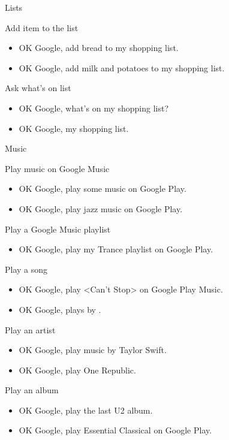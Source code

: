 \documentclass[
  a4paper,
]{article}
\providecommand{\tightlist}{%
  \setlength{\itemsep}{0pt}\setlength{\parskip}{0pt}}\usepackage{longtable,booktabs,array}
\begin{document}
Lists

Add item to the list

\begin{itemize}
\item
  OK Google, add bread to my shopping list.
\item
  OK Google, add milk and potatoes to my shopping list.
\end{itemize}

Ask what's on list

\begin{itemize}
\item
  OK Google, what's on my shopping list?
\item
  OK Google, my shopping list.
\end{itemize}

Music

Play music on Google Music

\begin{itemize}
\item
  OK Google, play some music on Google Play.
\item
  OK Google, play jazz music on Google Play.
\end{itemize}

Play a Google Music playlist

\begin{itemize}
\tightlist
\item
  OK Google, play my Trance playlist on Google Play.
\end{itemize}

Play a song

\begin{itemize}
\item
  OK Google, play \textless Can't Stop\textgreater{} on Google Play
  Music.
\item
  OK Google, plays by .
\end{itemize}

Play an artist

\begin{itemize}
\item
  OK Google, play music by Taylor Swift.
\item
  OK Google, play One Republic.
\end{itemize}

Play an album

\begin{itemize}
\item
  OK Google, play the last U2 album.
\item
  OK Google, play Essential Classical on Google Play.
\end{itemize}
\end{document}
